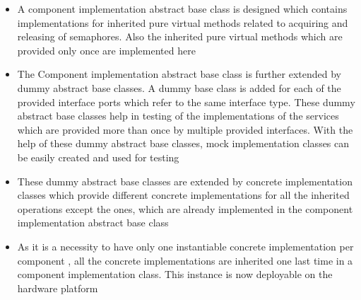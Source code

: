 \begin{itemize}
\item A component implementation abstract base class is designed which contains implementations for inherited pure virtual methods related to acquiring and releasing of semaphores. Also the inherited pure virtual methods which are provided only once are implemented here
\item The Component implementation abstract base class is further extended by dummy abstract base classes. A dummy base class is added for each of the provided interface ports which refer to the same interface type. These dummy abstract base classes help in testing of the implementations of the services which are provided more than once by multiple provided interfaces. With the help of these dummy abstract base classes, mock implementation classes can be easily created and used for testing \cite{InvOfCntrlurl}  
\item These dummy abstract base classes are extended by concrete implementation classes which provide different concrete implementations for all the inherited operations except the ones, which are already implemented in the component implementation abstract base class
\item As it is a necessity to have only one instantiable concrete implementation per component \cite{EvoRAVCodeAr,SpecMetamodel,CompBasedProcess}, all the concrete implementations are inherited one last time in a component implementation class. This instance is now deployable on the hardware platform
\end{itemize}
 
